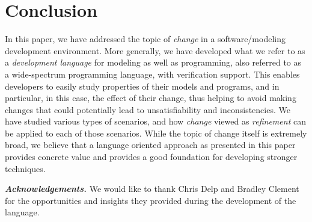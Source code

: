 
\section{Conclusion}
\label{sec:conclusion}

In this paper, we have addressed the topic of {\em change} in a
software/modeling development environment. More generally, we
have developed what we refer to as a  {\em development language} 
for modeling as well as programming, also referred to as a 
wide-spectrum programming language, with verification support. 
This enables developers to easily study properties of their models and programs, 
and in particular, in this case, the effect of their change, thus helping to
avoid making changes that could potentially lead to 
unsatisfiability
and inconsistencies. We have studied various types of 
scenarios, and how {\em change} viewed as {\em refinement} can be applied
to each of those scenarios. While the topic of change itself is
extremely broad, we believe that a language oriented approach as
presented in this paper provides concrete value and provides a good
foundation for developing stronger techniques.

\noindent \textbf{\em Acknowledgements.} We would like to thank
Chris Delp and Bradley Clement for the opportunities and insights they
provided during the development of the \Klang{} language.



